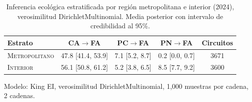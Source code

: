 
\begin{table}[htbp]
\centering
\caption{Inferencia ecológica estratificada por región metropolitana e interior (2024), verosimilitud DirichletMultinomial. Media posterior con intervalo de credibilidad al 95\%.}
\label{tab:stratified_dm_metropolitano_interior_2024}
\small
\begin{tabular}{lcccc}
\toprule
Estrato & CA$\to$FA & PC$\to$FA & PN$\to$FA & Circuitos \\
\midrule
\textsc{Metropolitano} & 47.8 [41.4, 53.9] & 7.1 [5.2, 8.7] & 0.2 [0.0, 0.7] & 3671 \\
\textsc{Interior} & 56.1 [50.8, 61.2] & 5.2 [3.8, 6.5] & 8.5 [7.7, 9.2] & 3600 \\
\bottomrule
\end{tabular}
\begin{tablenotes}\small
\item Modelo: King EI, verosimilitud DirichletMultinomial, 1{,}000 muestras por cadena, 2 cadenas.
\end{tablenotes}
\end{table}
